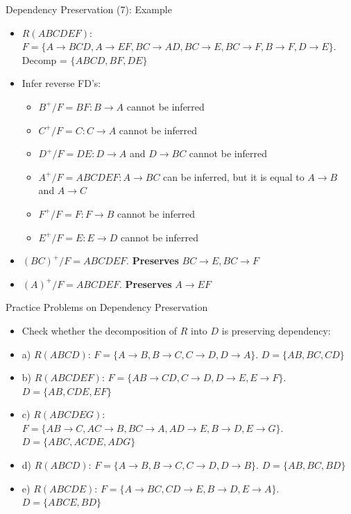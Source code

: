 \documentclass[aspectratio=169, xcolor=dvipsnames]{beamer}
\begin{document}
\begin{frame}{Dependency Preservation (7): Example}
    \begin{itemize}[<+->]
        \item $R(ABCDEF)$: $F = \{A \rightarrow BCD, A \rightarrow EF, BC \rightarrow AD, BC \rightarrow E, BC \rightarrow F, B \rightarrow F, D \rightarrow E\}$. Decomp = $\{ABCD, BF, DE\}$
        \item Infer reverse FD's:
        \begin{itemize}
            \item[$\triangleright$] $B^+ / F = BF: B \rightarrow A$ cannot be inferred
            \item[$\triangleright$] $C^+ / F = C: C \rightarrow A$ cannot be inferred
            \item[$\triangleright$] $D^+ / F = DE: D \rightarrow A$ and $D \rightarrow BC$ cannot be inferred
            \item[$\triangleright$] $A^+ / F = ABCDEF: A \rightarrow BC$ can be inferred, but it is equal to $A \rightarrow B$ and $A \rightarrow C$
            \item[$\triangleright$] $F^+ / F = F: F \rightarrow B$ cannot be inferred
            \item[$\triangleright$] $E^+ / F = E: E \rightarrow D$ cannot be inferred
        \end{itemize}
        \item $(BC)^+ / F = ABCDEF$. \textbf{Preserves} $BC \rightarrow E, BC \rightarrow F$
        \item $(A)^+ / F = ABCDEF$. \textbf{Preserves} $A \rightarrow EF$
    \end{itemize}
\end{frame}

\begin{frame}{Practice Problems on Dependency Preservation}
    \begin{itemize}[<+->]
        \item Check whether the decomposition of $R$ into $D$ is preserving dependency:
        \item a) $R(ABCD)$: $F = \{A \rightarrow B, B \rightarrow C, C \rightarrow D, D \rightarrow A\}$. $D = \{AB, BC, CD\}$
        \item b) $R(ABCDEF)$: $F = \{AB \rightarrow CD, C \rightarrow D, D \rightarrow E, E \rightarrow F\}$. $D = \{AB, CDE, EF\}$
        \item c) $R(ABCDEG)$: $F = \{AB \rightarrow C, AC \rightarrow B, BC \rightarrow A, AD \rightarrow E, B \rightarrow D, E \rightarrow G\}$. $D = \{ABC, ACDE, ADG\}$
        \item d) $R(ABCD)$: $F = \{A \rightarrow B, B \rightarrow C, C \rightarrow D, D \rightarrow B\}$. $D = \{AB, BC, BD\}$
        \item e) $R(ABCDE)$: $F = \{A \rightarrow BC, CD \rightarrow E, B \rightarrow D, E \rightarrow A\}$. $D = \{ABCE, BD\}$
    \end{itemize}
\end{frame}
\end{document}
